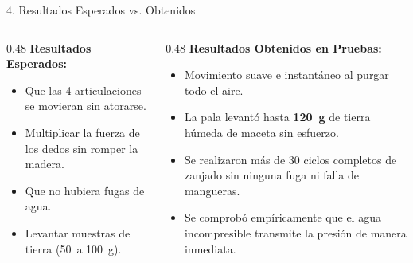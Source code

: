\documentclass[
  spanish,
  aspectratio=169,
  xcolor={dvipsnames,table}
]{beamer}
\begin{document}
\begin{frame}{4. Resultados Esperados vs. Obtenidos}
  \begin{columns}[T]
    \begin{column}{0.48\textwidth}
      \textbf{\color{uanlblue}Resultados Esperados:}
      \begin{itemize}
        \item Que las 4 articulaciones se movieran sin atorarse.
        \item Multiplicar la fuerza de los dedos sin romper la madera.
        \item Que no hubiera fugas de agua.
        \item Levantar muestras de tierra (\SI{50}{a} \SI{100}{g}).
      \end{itemize}
    \end{column}
    \begin{column}{0.48\textwidth}
      \textbf{\color{uanlblue}Resultados Obtenidos en Pruebas:}
      \begin{itemize}
        \item Movimiento suave e instantáneo al purgar todo el aire.
        \item La pala levantó hasta \textbf{\SI{120}{g}} de tierra húmeda de maceta sin esfuerzo.
        \item Se realizaron más de 30 ciclos completos de zanjado sin ninguna fuga ni falla de mangueras.
        \item Se comprobó empíricamente que el agua incompresible transmite la presión de manera inmediata.
      \end{itemize}
    \end{column}
  \end{columns}
\end{frame}
\end{document}
